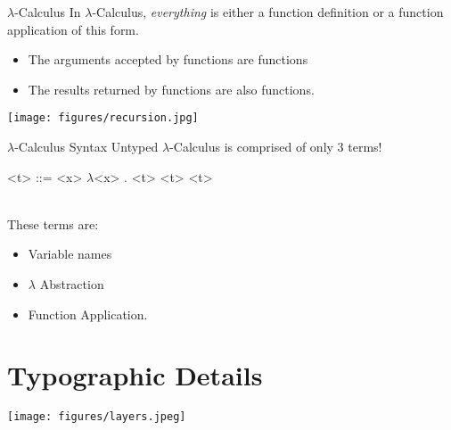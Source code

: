 \documentclass[11pt]{beamer}
\begin{document}
\begin{frame}[fragile=singleslide]{$\lambda$-Calculus}
In $\lambda$-Calculus, \emph{everything} is either a function definition or a function application of this form.  
\begin{itemize}
\item The arguments accepted by functions are functions
\item The results returned by functions are also functions.  
\end{itemize}
\begin{center}
\texttt{[image: figures/recursion.jpg]}
\end{center}

\end{frame}


\begin{frame}[fragile=singleslide]{$\lambda$-Calculus Syntax}
Untyped $\lambda$-Calculus is comprised of only 3 terms! \\
\dotfill
\begin{grammar}
<t> ::= <x> 
\alt $\lambda$<x> . <t>
\alt <t> <t>
\end{grammar}
\dotfill \\
These terms are:
\begin{itemize}
\item Variable names
\item $\lambda$ Abstraction
\item Function Application.
\end{itemize}
\end{frame}


\section[Typography]{Typographic Details}
\begin{frame}[fragile=singleslide]{}
\begin{center}
\texttt{[image: figures/layers.jpeg]}
\end{center}
\end{frame}
\end{document}
